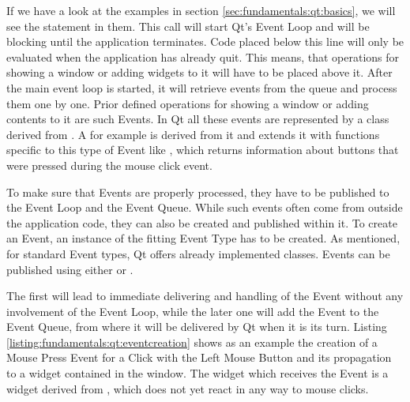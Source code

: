 If we have a look at the examples in section \ref{sec:fundamentals:qt:basics},
we will see the statement  in them. This call will
start Qt's Event Loop and will be blocking until the application terminates.
Code placed below this line will only be evaluated when the application has
already quit. This means, that operations for showing a window or adding widgets
to it will have to be placed above it. After the main event loop is started, it
will retrieve events from the queue and process them one by one. Prior defined
operations for showing a window or adding contents to it are such
Events. In Qt all these events are represented by a class derived from
. A  for
example is derived from it and extends it with functions specific to this type
of Event like , which returns
information about buttons that were pressed during the mouse click event.

To make sure that Events are properly processed, they have to be published to
the Event Loop and the Event Queue. While such events often come from outside
the application code, they can also be created and published within it. To
create an Event, an instance of the fitting Event Type has to be created. As
mentioned, for standard Event types, Qt offers already implemented classes.
Events can be published using either 
 or
. 

The first will lead to immediate delivering and handling of the Event without
any involvement of the Event Loop, while the later one will add the Event to the
Event Queue, from where it will be delivered by Qt when it is its turn. Listing
\ref{listing:fundamentals:qt:eventcreation} shows as an example the creation of
a Mouse Press Event for a Click with the Left Mouse Button and its propagation
to a widget contained in the window. The widget which receives the Event is a
widget derived from , which does not yet
react in any way to mouse clicks.



